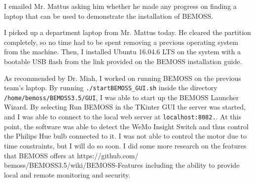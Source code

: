 \documentclass[fontsize=11pt, %
                             paper=letter, %
                             twoside, %
                             captions=tableheading,
                             index=totoc,
                             hyperref]{labbook}
\begin{document}
\begin{addmargin}[0cm]{0cm} %

\pagestyle{scrheadings} %

I emailed Mr. Mattus asking him whether he made any progress on finding a laptop that
can be used to demonstrate the installation of BEMOSS. 
 
I picked up a department laptop from Mr. Mattus today. He cleared the partition
completely, so no time had to be spent removing a previous operating system from the
machine. Then, I installed Ubuntu 16.04.6 LTS on the system with a bootable USB flash
from the link provided on the BEMOSS installation guide.

As recommended by Dr. Miah, I worked on running BEMOSS on the previous team’s laptop. By running \texttt{./startBEMOSS\_GUI.sh} inside the directory \texttt{/home/bemoss/BEMOSS3.5/GUI}, I was able to start up the BEMOSS Launcher Wizard. By selecting Run BEMOSS in the TKinter GUI the server was started,
and I was able to connect to the local web server at \texttt{localhost:8082.}. At this point, the software was able to detect the WeMo Insight Switch and thus control the Philips Hue bulb connected to it. I was not able to control the motor due to time constraints, but I will do so soon.
\medbreak\noindent
I did some more research on the features that BEMOSS offers at https://github.com/
bemoss/BEMOSS3.5/wiki/BEMOSS-Features including the ability to provide local and remote monitoring and security.



\end{addmargin}
\end{document}
